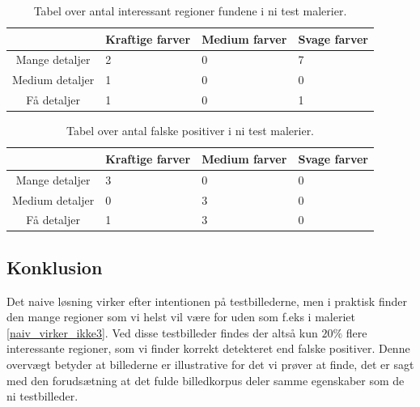 \begin{table}[H]
    \centering
    \begin{tabular}{|c|l|l|l|}
			\hline
            & Kraftige farver & Medium farver & Svage farver \\\hline
		Mange detaljer	& 2 & 0 & 7 \\\hline
        Medium detaljer  & 1 & 0 & 0 \\\hline
        Få detaljer     & 1 & 0 & 1 \\\hline
    \end{tabular}
    \caption[]{Tabel over antal interessant regioner fundene i ni test malerier.}
    \label{naiv_good}
\end{table}

\begin{table}[H]
    \centering
    \begin{tabular}{|c|l|l|l|}
			\hline
            & Kraftige farver & Medium farver & Svage farver \\\hline
		Mange detaljer	& 3 & 0 & 0 \\\hline
        Medium detaljer  & 0 & 3 & 0 \\\hline
        Få detaljer     & 1 & 3 & 0 \\\hline
    \end{tabular}
    \caption[]{Tabel over antal falske positiver i ni test malerier.}
    \label{naiv_bad}
\end{table}

\subsection{Konklusion}
Det naive løsning virker efter intentionen på testbillederne, men i
praktisk finder den mange regioner som vi helst
vil være for uden som f.eks i maleriet \ref{naiv_virker_ikke3}. 
Ved disse testbilleder findes der altså kun $20\%$ flere interessante
regioner, som vi finder korrekt detekteret end falske positiver. 
Denne overvægt betyder at billederne er illustrative for det vi prøver
at finde, det er sagt med den forudsætning at det fulde billedkorpus
deler samme egenskaber som de ni testbilleder.
